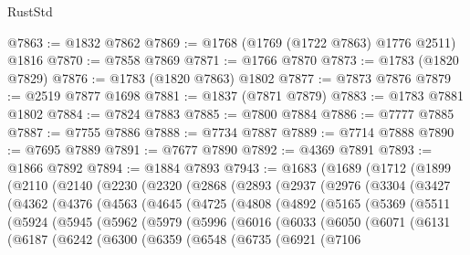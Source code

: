 \begin{lexlean}{RustStd}
\begin{coremodule}
@7863 := @1832 @7862
@7869 := @1768 (@1769 (@1722 @7863) @1776 @2511) @1816
@7870 := @7858 @7869
@7871 := @1766 @7870
@7873 := @1783 (@1820 @7829)
@7876 := @1783 (@1820 @7863) @1802
@7877 := @7873 @7876
@7879 := @2519 @7877 @1698
@7881 := @1837 (@7871 @7879)
@7883 := @1783 @7881 @1802
@7884 := @7824 @7883
@7885 := @7800 @7884
@7886 := @7777 @7885
@7887 := @7755 @7886
@7888 := @7734 @7887
@7889 := @7714 @7888
@7890 := @7695 @7889
@7891 := @7677 @7890
@7892 := @4369 @7891
@7893 := @1866 @7892
@7894 := @1884 @7893
@7943 := @1683
    (@1689
      (@1712
        (@1899
          (@2110
            (@2140
              (@2230
                (@2320
                  (@2868
                    (@2893
                      (@2937
                        (@2976
                          (@3304
                            (@3427
                              (@4362
                                (@4376
                                  (@4563
                                    (@4645
                                      (@4725
                                        (@4808
                                          (@4892
                                            (@5165
                                              (@5369
                                                (@5511
                                                  (@5924
                                                    (@5945
                                                      (@5962
                                                        (@5979
                                                          (@5996
                                                            (@6016
                                                              (@6033
                                                                (@6050
                                                                  (@6071
                                                                    (@6131
                                                                      (@6187
                                                                        (@6242
                                                                          (@6300
                                                                            (@6359
                                                                              (@6548
                                                                                (@6735
                                                                                  (@6921
                                                                                    (@7106

\end{coremodule}
\end{lexlean}
